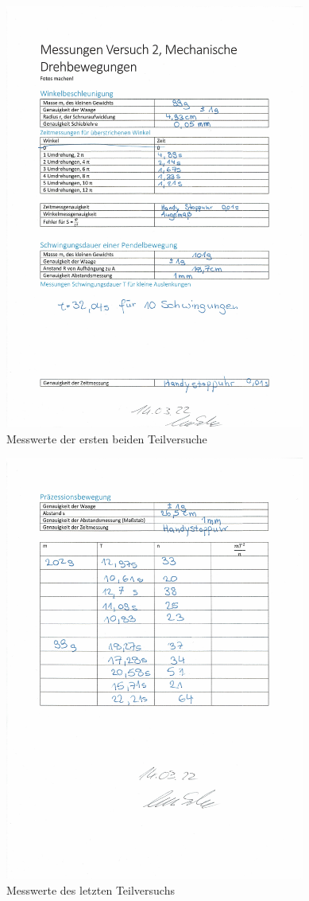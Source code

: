 \documentclass{article}
\begin{document}
	\begin{figure}[!ht]\label{fig:Messwerte1}
		\centering
		\includegraphics[height=14cm]{messwerte1.jpg}
		\caption{Messwerte der ersten beiden Teilversuche}
	\end{figure}

	\begin{figure}[!ht]\label{fig:Messwerte2}
		\centering
		\includegraphics[height=14cm]{messwerte2.jpg}
		\caption{Messwerte des letzten Teilversuchs}
	\end{figure}
\end{document}
